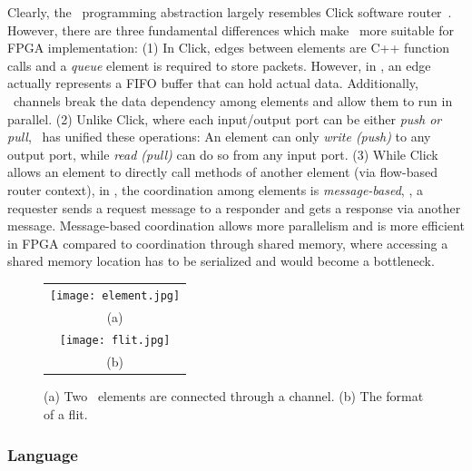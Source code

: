 Clearly, the \name\ programming abstraction largely resembles Click software router~\cite{kohler2000click}. 
However, there are three fundamental differences which make \name\ more suitable
for FPGA implementation:
(1) In Click, edges between elements are C++ function calls and a \textit{queue} element is required to store packets.
However, in \name, an edge actually represents a FIFO buffer that can hold actual data. Additionally, \name\ channels break the data dependency among elements and allow them to run in parallel. 
(2) Unlike Click, where each input/output port can be either \textit{push or pull}, 
\name\ has unified these operations: An element can only \textit{write (push)}  to any output port, while \textit{read (pull)} can do so from any input port.
(3) While Click allows an element to directly call methods of another element (via flow-based router context), in \name,
the coordination among elements is \textit{message-based}, \eg, a requester sends a request message to a responder and gets a response via another message.
%
Message-based coordination allows more parallelism and is more efficient in FPGA compared to coordination through shared memory, where accessing a shared memory location has to be serialized and would become a bottleneck.

\begin{figure}
\centering
\begin{tabular}{c}
\texttt{[image: element.jpg]}  \\
(a)\\
\texttt{[image: flit.jpg]} \\
(b) \\
\end{tabular}

\caption{(a) Two \name\ elements are connected through a channel. (b) The format of a flit. }
\label{clicknp:fig:element}

\end{figure}

\subsubsection{Language}

